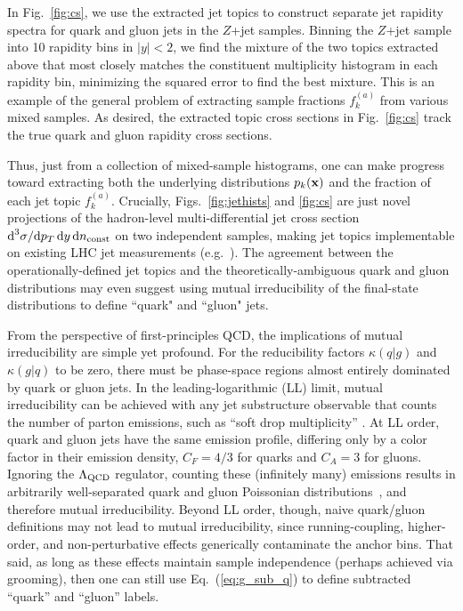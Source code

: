 \documentclass[aps,prl,floatfix,preprintnumbers,twocolumn,groupedaddress,nofootinbib,longbibliography]{revtex4-1}
\DeclareRobustCommand{\Fig}[1]{Fig.~\ref{#1}}
\DeclareRobustCommand{\Figs}[2]{Figs.~\ref{#1} and \ref{#2}}
\DeclareRobustCommand{\Eq}[1]{Eq.~(\ref{#1})}
\begin{document}
In \Fig{fig:cs}, we use the extracted jet topics to construct separate jet rapidity spectra for quark and gluon jets in the $Z$+jet samples.
%
Binning the $Z$+jet sample into 10 rapidity bins in $|y|<2$, we find the mixture of the two topics extracted above that most closely matches the constituent multiplicity histogram in each rapidity bin, minimizing the squared error to find the best mixture.
%
This is an example of the general problem of extracting sample fractions $f_k^{(a)}$ from various mixed samples.
%
As desired, the extracted topic cross sections in \Fig{fig:cs} track the true quark and gluon rapidity cross sections.

Thus, just from a collection of mixed-sample histograms, one can make progress toward extracting both the underlying distributions $p_k({\bf x})$ and the fraction of each jet topic $f_k^{(a)}$.
%
Crucially, \Figs{fig:jethists}{fig:cs} are just novel projections of the hadron-level multi-differential jet cross section $\text{d}^3 \sigma / \text{d} p_T \,  \text{d} y \, \text{d} n_{\rm const}$ on two independent samples, making jet topics implementable on existing LHC jet measurements (e.g.~\cite{Aad:2016oit}).
%
The agreement between the operationally-defined jet topics and the theoretically-ambiguous quark and gluon distributions may even suggest using mutual irreducibility of the final-state distributions to define ``quark" and ``gluon" jets.



From the perspective of first-principles QCD, the implications of mutual irreducibility are simple yet profound.
%
For the reducibility factors $\kappa(q|g)$ and $\kappa(g|q)$ to be zero, there must be phase-space regions almost entirely dominated by quark or gluon jets.
%
In the leading-logarithmic (LL) limit, mutual irreducibility can be achieved with any jet substructure observable that counts the number of parton emissions, such as ``soft drop multiplicity'' \cite{Frye:2017yrw}.
%
At LL order, quark and gluon jets have the same emission profile, differing only by a color factor in their emission density, $C_F = 4/3$ for quarks and $C_A = 3$ for gluons.
%
Ignoring the $\Lambda_{\rm QCD}$ regulator, counting these (infinitely many) emissions results in arbitrarily well-separated quark and gluon Poissonian distributions~\cite{Frye:2017yrw}, and therefore mutual irreducibility.
%
Beyond LL order, though, naive quark/gluon definitions may not lead to mutual irreducibility, since running-coupling, higher-order, and non-perturbative effects generically contaminate the anchor bins.
%
That said, as long as these effects maintain sample independence (perhaps achieved via grooming), then one can still use \Eq{eq:g_sub_q} to define subtracted ``quark'' and ``gluon'' labels.
\end{document}
